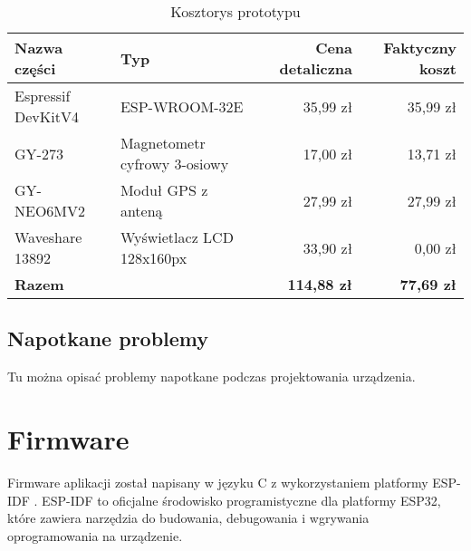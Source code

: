 \begin{table}[h]
    \centering
    \begin{tabular}{|l|l|r|r|}
        \hline
        \textbf{Nazwa części} & \textbf{Typ}                 & \textbf{Cena detaliczna} & \textbf{Faktyczny koszt} \\ \hline
        Espressif DevKitV4    & ESP-WROOM-32E                & 35,99 zł                 & 35,99 zł                 \\ \hline
        GY-273                & Magnetometr cyfrowy 3-osiowy & 17,00 zł                 & 13,71 zł                 \\ \hline
        GY-NEO6MV2            & Moduł GPS z anteną           & 27,99 zł                 & 27,99 zł                 \\ \hline
        Waveshare 13892       & Wyświetlacz LCD 128x160px    & 33,90 zł                 & 0,00 zł                  \\ \hline
        \textbf{Razem}        &                              & \textbf{114,88 zł}       & \textbf{77,69 zł}        \\ \hline
    \end{tabular}
    \caption{Kosztorys prototypu}
\end{table}
\subsection{Napotkane problemy}
Tu można opisać problemy napotkane podczas projektowania urządzenia.

\section{Firmware}
Firmware aplikacji został napisany w języku C z wykorzystaniem platformy ESP-IDF \cite{esp-idf}.
ESP-IDF to oficjalne środowisko programistyczne dla platformy ESP32, które zawiera narzędzia do budowania, debugowania i wgrywania oprogramowania na urządzenie.

